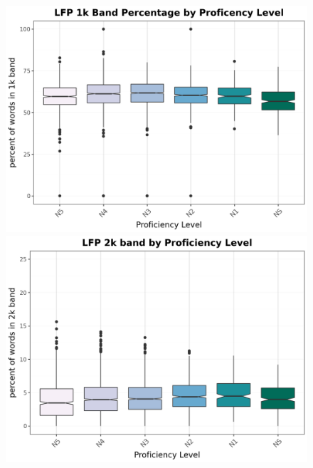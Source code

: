 \begin{figure}[htbp]
    \centering
    \begin{minipage}{.48\textwidth}
        \centering
    \includegraphics[scale=.4]{img/LFP/1k}
    \caption[Percentage of tokens used from 1k band]{}
        \label{fig:1kband}
    \end{minipage}
    \hfill
\begin{minipage}{.48\textwidth}
        \centering
        \includegraphics[scale=.4]{img/LFP/2k}
        \caption[Percentage of tokens used from 2k band]{}
\label{fig:2kband}
\end{minipage}
    \end{figure}


